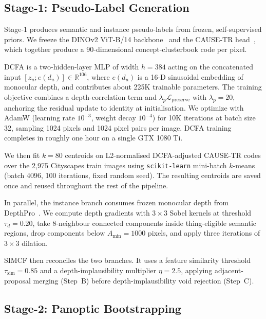 \documentclass{article}
\begin{document}
\subsection{Stage-1: Pseudo-Label Generation}
\label{sec:supp:impl:stage1}

Stage-1 produces semantic and instance pseudo-labels from frozen, self-supervised priors. We freeze the DINOv2 ViT-B/14 backbone~\cite{oquab2024dinov2} and the CAUSE-TR head~\cite{kim2024cause}, which together produce a 90-dimensional concept-clusterbook code per pixel.

DCFA is a two-hidden-layer MLP of width $h{=}384$ acting on the concatenated input $[z_u; e(d_u)] \in \mathbb{R}^{106}$, where $e(d_u)$ is a 16-D sinusoidal embedding of monocular depth, and contributes about 225K trainable parameters. The training objective combines a depth-correlation term and $\lambda_p \mathcal{L}_\text{preserve}$ with $\lambda_p{=}20$, anchoring the residual update to identity at initialisation. We optimize with AdamW (learning rate $10^{-3}$, weight decay $10^{-4}$) for 10K iterations at batch size 32, sampling 1024 pixels and 1024 pixel pairs per image. DCFA training completes in roughly one hour on a single GTX 1080 Ti.

We then fit $k{=}80$ centroids on L2-normalised DCFA-adjusted CAUSE-TR codes over the 2{,}975 Cityscapes train images using \texttt{scikit-learn} mini-batch $k$-means (batch 4096, 100 iterations, fixed random seed). The resulting centroids are saved once and reused throughout the rest of the pipeline.

In parallel, the instance branch consumes frozen monocular depth from DepthPro~\cite{bochkovskii2024depthpro}. We compute depth gradients with $3\times3$ Sobel kernels at threshold $\tau_d{=}0.20$, take 8-neighbour connected components inside thing-eligible semantic regions, drop components below $A_\text{min}{=}1000$ pixels, and apply three iterations of $3\times3$ dilation.

SIMCF then reconciles the two branches. It uses a feature similarity threshold $\tau_\text{sim}{=}0.85$ and a depth-implausibility multiplier $\eta{=}2.5$, applying adjacent-proposal merging (Step~B) before depth-implausibility void rejection (Step~C).

\subsection{Stage-2: Panoptic Bootstrapping}
\label{sec:supp:impl:stage2}
\end{document}

